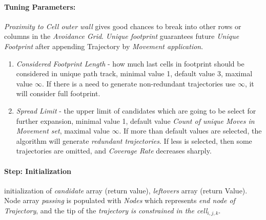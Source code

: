 \paragraph{Tuning Parameters:} \emph{Proximity to Cell outer wall} gives good chances to break into other rows or columns in the \emph{Avoidance Grid}. \emph{Unique footprint} guarantees future \emph{Unique Footprint} after appending Trajectory by \emph{Movement application}. 
\begin{enumerate}
    \item \emph{Considered Footprint Length} - how much last cells in footprint should be considered in unique path track, minimal value 1, default value 3, maximal value $\infty$. If there is a need to generate non-redundant trajectories use $\infty$, it will consider full footprint.
    
    \item \emph{Spread Limit} - the upper limit of candidates which are going to be select for further expansion, minimal value 1, default value \emph{Count of unique Moves in Movement set}, maximal value $\infty$. If more than default values are selected, the algorithm will generate \emph{redundant trajectories}. If less is selected, then some trajectories are omitted, and \emph{Coverage Rate} decreases sharply. 
\end{enumerate}

\paragraph{Step: Initialization} initialization of \emph{candidate} array (return value), \emph{leftovers} array (return Value). Node array \emph{passing} is populated with \emph{Nodes} which represents \emph{end node of Trajectory}, and the tip of the  \emph{trajectory is constrained in the \emph{cell}$_{i,j,k}$}.

